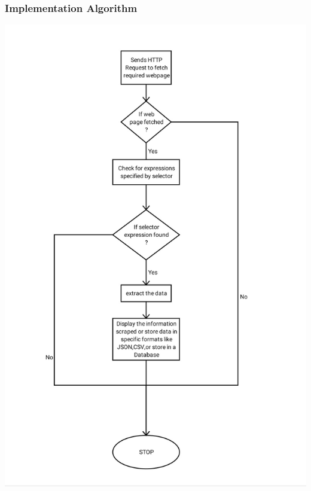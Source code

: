 \documentclass{beamer}
\begin{document}
\begin{frame}
\frametitle{Implementation Algorithm}
\center\includegraphics[scale=.12]{IMG_20191017_083215.jpg} 
\end{frame}
\end{document}
